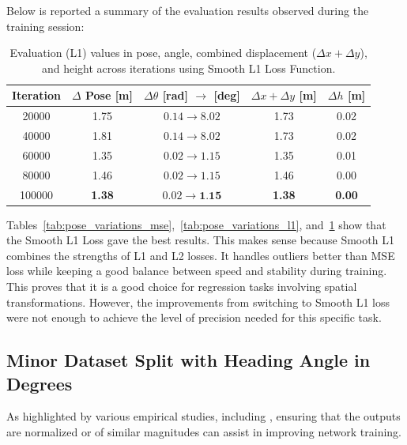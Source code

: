 Below is reported a summary of the evaluation results observed during the training session:
\begin{table}[H]
    \centering
    \scriptsize
    \renewcommand{\arraystretch}{1.2} 
    \setlength{\tabcolsep}{10pt} 
    \begin{tabular}{c c c c c}
        \toprule
        \textbf{Iteration} & \textbf{$\Delta$ Pose [m]} & \textbf{$\Delta \theta$ [rad] $\rightarrow$ [deg]} & \textbf{$\Delta x + \Delta y$ [m]} & \textbf{$\Delta h$ [m]} \\
        \midrule
        \num{20000}  & 1.75 & $0.14 \rightarrow 8.02$  & 1.73 & 0.02 \\
        \num{40000}  & 1.81 & $0.14 \rightarrow 8.02$  & 1.73 & 0.02 \\
        \num{60000}  & 1.35 & $0.02 \rightarrow 1.15$  & 1.35 & 0.01 \\
        \num{80000}  & 1.46 & $0.02 \rightarrow 1.15$  & 1.46 & 0.00 \\
        \num{100000} & \textbf{1.38} & $0.02 \rightarrow \textbf{1.15}$  & \textbf{1.38} & \textbf{0.00} \\
        \bottomrule
    \end{tabular}
    \caption{Evaluation (L1) values in pose, angle, combined displacement ($\Delta x + \Delta y$), and height across iterations using Smooth L1 Loss Function.}
    \label{tab:pose_variations_l1s}
\end{table}

Tables~\ref{tab:pose_variations_mse},~\ref{tab:pose_variations_l1}, and~\ref{tab:pose_variations_l1s} show that the Smooth L1 Loss gave the best results. This makes sense because Smooth L1 combines the strengths of L1 and L2 losses. It handles outliers better than MSE loss while keeping a good balance between speed and stability during training. This proves that it is a good choice for regression tasks involving spatial transformations. However, the improvements from switching to Smooth L1 loss were not enough to achieve the level of precision needed for this specific task.

\subsection*{Minor Dataset Split with Heading Angle in Degrees}
As highlighted by various empirical studies, including \cite{yu2022normalizationeffectsdeepneural}, ensuring that the outputs are normalized or of similar magnitudes can assist in improving network training.

